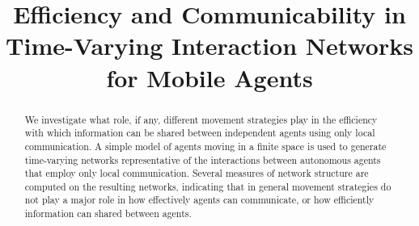 \documentclass[conference]{IEEEtran}
\begin{document}
\title{Efficiency and Communicability in Time-Varying Interaction Networks for Mobile Agents}

\author{
}


% 

\maketitle

\begin{abstract}
We investigate what role, if any, different movement strategies play
in the efficiency with which information can be shared between
independent agents using only local communication. A simple model of
agents moving in a finite space is used to generate time-varying
networks representative of the interactions between autonomous agents
that employ only local communication. Several measures of network
structure are computed on the resulting networks, indicating that in
general movement strategies do not play a major role in how
effectively agents can communicate, or how efficiently information can
shared between agents.
\end{abstract}
\end{document}
